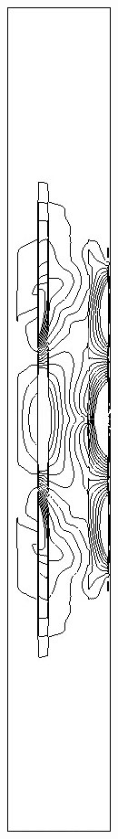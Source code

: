\begin{figure}[h]
\begin{subfigure}[b]{0.15\textwidth}
\caption{ }
\end{subfigure}
\begin{subfigure}[b]{0.15\textwidth}
\centering
\includegraphics[width=\textwidth]{png/cranium/2d-syy-01.png}

\end{subfigure}
\end{figure}
